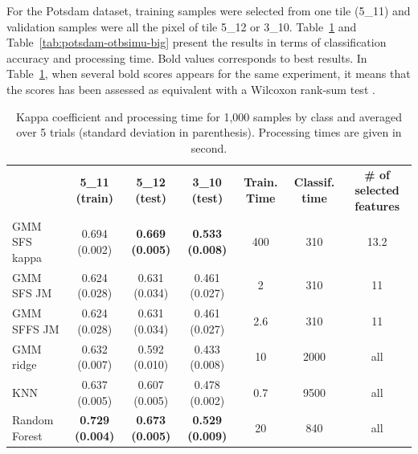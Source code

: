 \documentclass[journal,10pt]{IEEEtran}
\begin{document}
    For the Potsdam  dataset, training samples were  selected from one
    tile (5\_11)  and validation  samples were all  the pixel  of tile
    5\_12     or    3\_10.      Table~\ref{tab:potsdam-otbsimu}    and
    Table~\ref{tab:potsdam-otbsimu-big} present  the results  in terms
    of classification accuracy and processing time. Bold values corresponds to best results. In Table~\ref{tab:potsdam-otbsimu}, when several bold scores appears for the same experiment, it means that the scores has been assessed as equivalent with a Wilcoxon rank-sum test \cite{mann1947test}.

    \begin{table}[!t]
        \centering
        \caption{Kappa coefficient and processing time for 1,000 samples by class and averaged over 5 trials (standard deviation in parenthesis). Processing times are given in second.\label{tab:potsdam-otbsimu}}
        \begin{tabular}{lcccccc}\toprule
            & {\bfseries 5\_11 (train)} & {\bfseries 5\_12 (test)} & {\bfseries 3\_10 (test)} & {\bfseries Train. Time} & {\bfseries Classif. time} & {\bfseries \# of selected features} \\ \cmidrule{2-7}
            GMM SFS kappa & 0.694 (0.002)             & {\bfseries 0.669 (0.005)} & {\bfseries 0.533 (0.008)} & 400 & 310  & 13.2 \\
            GMM SFS JM &    0.624 (0.028)             & 0.631 (0.034)             & 0.461 (0.027)             & 2   & 310  & 11 \\
            GMM SFFS JM &   0.624 (0.028)             & 0.631 (0.034)             & 0.461 (0.027)             & 2.6 & 310  & 11 \\
            GMM ridge &     0.632 (0.007)             & 0.592 (0.010)             & 0.433 (0.008)             & 10  & 2000 & all \\
            KNN &           0.637 (0.005)             & 0.607 (0.005)             & 0.478 (0.002)             & 0.7 & 9500 & all \\
            Random Forest & {\bfseries 0.729 (0.004)} & {\bfseries 0.673 (0.005)} & {\bfseries 0.529 (0.009)} & 20  & 840  & all \\
            \bottomrule
        \end{tabular}
    \end{table}
\end{document}
